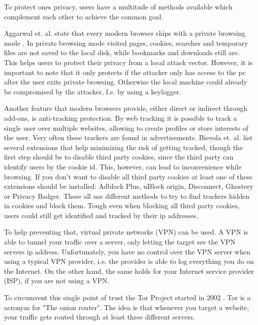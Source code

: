 \documentclass[a4paper]{llncs}
\begin{document}

To protect ones privacy, users have a multitude of methods available which complement each other to achieve the common goal.

Aggarwal et. al. state that every modern browser ships with a private browsing mode \cite{Aggarwal:2010:APB:1929820.1929828}. In private browsing mode visited pages, cookies, searches and temporary files are not saved to the local disk, while bookmarks and downloads still are. This helps users to protect their privacy from a local attack vector. However, it is important to note that it only protects if the attacker only has access to the pc after the user exits private browsing. Otherwise the local machine could already be compromised by the attacker, f.e. by using a keylogger.

Another feature that modern browsers provide, either direct or indirect through add-ons, is anti-tracking protection. By web tracking it is possible to track a single user over multiple websites, allowing to create profiles or store interests of the user. Very often these trackers are found in advertisements. Bievola et. al. \cite{Bielova:2017:WTT:3133956.3136067} list several extensions that help minimizing the risk of getting tracked, though the first step should be to disable third party cookies, since the third party can identify users by the cookie id. This, however, can lead to inconvenience while browsing. If you don't want to disable all third party cookies at least one of these extensions should be installed: Adblock Plus, uBlock origin, Disconnect, Ghostery or Privacy Badger. These all use different methods to try to find trackers hidden in cookies and block them. Tough even when blocking all third party cookies, users could still get identified and tracked by their ip addresses.

To help preventing that, virtual private networks (VPN) can be used. A VPN 
is able to tunnel your traffic over a server, only letting the target see the VPN servers ip address. Unfortunately, you have no control over the VPN server when using a typical VPN provider, i.e. the provider is able to log everything you do on the Internet. On the other hand, the same holds for your Internet service provider (ISP), if you are not using a VPN.

To circumvent this single point of trust the Tor Project started in 2002 \cite{torproject}. Tor is a acronym for "The onion router". The idea is that whenever you target a website, your traffic gets routed through at least three different servers.
\end{document}
